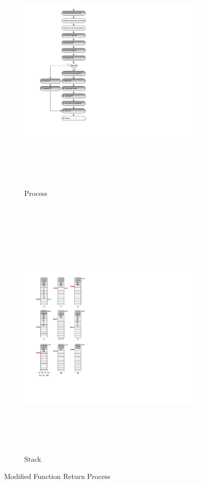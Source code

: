 \begin{figure}[h]
        \centering
        \begin{subfigure}[b]{0.5\columnwidth}
                \includegraphics[width=\textwidth, height=12cm]{figures/modified_function_operations_process_post_execution_v2}
                \caption{Process}
                \label{fig:modified_function_operation_process_post_execution}
        \end{subfigure}~
        \begin{subfigure}[b]{0.5\columnwidth}
                \includegraphics[width=\textwidth, height=12cm]{figures/modified_function_operations_stack_post_execution_v2}
                \caption{Stack}
                \label{fig:modified_function_operation_stack_post_execution}
        \end{subfigure}
        \caption{Modified Function Return Process}\label{fig:modified_function_operation_post_execution}
        \vspace{-15pt}
\end{figure}

